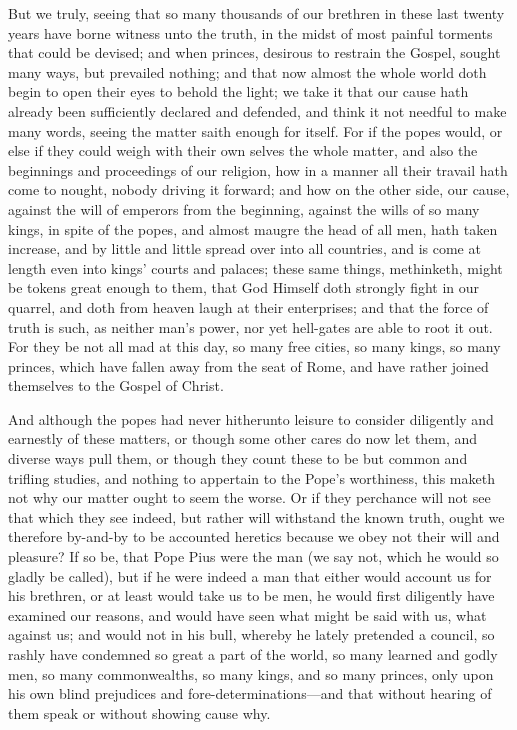 But we truly, seeing that so many thousands of our brethren in these
last twenty years have borne witness unto the truth, in the midst of
most painful torments that could be devised; and when princes, desirous
to restrain the Gospel, sought many ways, but prevailed nothing; and
that now almost the whole
world doth begin to open their eyes to behold the light; we take it
that our cause hath already been sufficiently declared and defended,
and think it not needful to make many words, seeing the matter saith
enough for itself. For if the popes would, or else if they could
weigh with their own selves the whole matter, and also the beginnings
and proceedings of our religion, how in a manner all their travail hath
come to nought, nobody driving it forward; and how on the other side,
our cause, against the will of emperors from the beginning, against
the wills of so many kings, in spite of the popes, and almost maugre
the head of all men, hath taken increase, and by little and little spread
over into all countries, and is come at length even into kings’
courts and palaces; these same things, methinketh, might be tokens great
enough to them, that God Himself doth strongly fight in our quarrel,
and doth from heaven laugh at their enterprises; and that the force
of truth is such, as neither man’s power, nor yet hell-gates are
able to root it out. For they be not all mad at this day, so many
free cities, so many kings, so many princes, which have fallen away
from the seat of Rome, and have rather joined themselves to the Gospel
of Christ.

And although the popes had never hitherunto leisure to consider diligently
and earnestly of these matters,
or though some other cares do now let them, and diverse ways pull them,
or though they count these to be but common and trifling studies, and
nothing to appertain to the Pope’s worthiness, this maketh not
why our matter ought to seem the worse. Or if they perchance will
not see that which they see indeed, but rather will withstand the known
truth, ought we therefore by-and-by to be accounted heretics because
we obey not their will and pleasure? If so be, that Pope Pius
were the man (we say not, which he would so gladly be called), but if
he were indeed a man that either would account us for his brethren,
or at least would take us to be men, he would first diligently have
examined our reasons, and would have seen what might be said with us,
what against us; and would not in his bull, whereby he lately pretended
a council, so rashly have condemned so great a part of the world, so
many learned and godly men, so many commonwealths, so many kings, and
so many princes, only upon his own blind prejudices and fore-determinations—and
that without hearing of them speak or without showing cause why.

